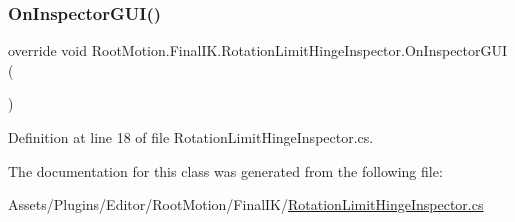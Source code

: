\subsubsection{\texorpdfstring{On\+Inspector\+G\+U\+I()}{OnInspectorGUI()}}
{\footnotesize\ttfamily override void Root\+Motion.\+Final\+I\+K.\+Rotation\+Limit\+Hinge\+Inspector.\+On\+Inspector\+G\+UI (\begin{DoxyParamCaption}{ }\end{DoxyParamCaption})}



Definition at line 18 of file Rotation\+Limit\+Hinge\+Inspector.\+cs.



The documentation for this class was generated from the following file\+:\begin{DoxyCompactItemize}
\item 
Assets/\+Plugins/\+Editor/\+Root\+Motion/\+Final\+I\+K/\mbox{\hyperlink{_rotation_limit_hinge_inspector_8cs}{Rotation\+Limit\+Hinge\+Inspector.\+cs}}\end{DoxyCompactItemize}
